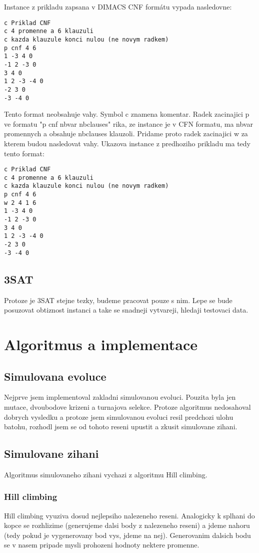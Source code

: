 \documentclass[12pt,a4paper]{article}
\begin{document}
Instance z prikladu zapsana v DIMACS CNF formátu vypada nasledovne:

\begin{verbatim}
c Priklad CNF
c 4 promenne a 6 klauzuli
c kazda klauzule konci nulou (ne novym radkem)
p cnf 4 6
1 -3 4 0
-1 2 -3 0
3 4 0
1 2 -3 -4 0
-2 3 0
-3 -4 0
\end{verbatim}

Tento format neobsahuje vahy. Symbol c znamena komentar. Radek zacinajici p ve formatu "p cnf nbvar nbclauses" rika, ze instance je v CFN formatu, ma nbvar promennych a obsahuje nbclauses klauzoli. Pridame proto radek zacinajici w za kterem budou nasledovat vahy. Ukazova instance z predhoziho prikladu ma tedy tento format:

\begin{verbatim}
c Priklad CNF
c 4 promenne a 6 klauzuli
c kazda klauzule konci nulou (ne novym radkem)
p cnf 4 6
w 2 4 1 6
1 -3 4 0
-1 2 -3 0
3 4 0
1 2 -3 -4 0
-2 3 0
-3 -4 0
\end{verbatim}

\subsection{3SAT}

Protoze je 3SAT stejne tezky, budeme pracovat pouze s nim. Lepe se bude posuzovat obtiznost instanci a take se snadneji vytvareji, hledaji testovaci data.


\section{Algoritmus a implementace}

\subsection{Simulovana evoluce}
Nejprve jsem implementoval zakladni simulovanou evoluci. Pouzita byla jen mutace, dvoubodove krizeni a turnajova selekce. Protoze algoritmus nedosahoval dobrych vysledku a protoze jsem simulovanou evoluci resil predchozi ulohu batohu, rozhodl jsem se od tohoto reseni upustit a zkusit simulovane zihani.

\subsection{Simulovane zihani}
Algoritmus simulovaneho zihani vychazi z algoritmu Hill climbing.

\subsubsection{Hill climbing}
Hill climbing vyuziva dosud nejlepsiho nalezeneho reseni. Analogicky k splhani do kopce se rozhlizime (generujeme dalsi body z nalezeneho reseni) a jdeme nahoru (tedy pokud je vygenerovany bod vys, jdeme na nej). Generovanim dalsich bodu se v nasem pripade mysli prohozeni hodnoty nektere promenne.
\end{document}
